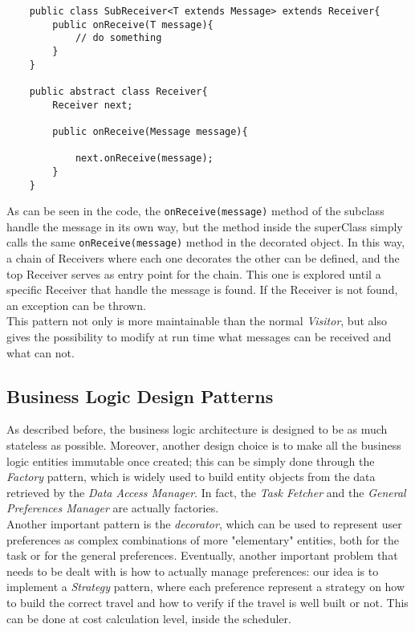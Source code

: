 \begin{verbatim}
    public class SubReceiver<T extends Message> extends Receiver{
        public onReceive(T message){
            // do something
        }
    }
    
    public abstract class Receiver{
        Receiver next;
        
        public onReceive(Message message){
        
            next.onReceive(message);
        }
    }
\end{verbatim}

As can be seen in the code, the \texttt{onReceive(message)} method of the subclass handle the message in its own way, but the method inside the superClass simply calls the same \texttt{onReceive(message)} method in the decorated object. In this way, a chain of Receivers where each one decorates the other can be defined, and the top Receiver serves as entry point for the chain. This one is explored until a specific Receiver that handle the message is found. If the Receiver is not found, an exception can be thrown.\\ 

This pattern not only is more maintainable than the normal \emph{Visitor}, but also gives the possibility to modify at run time what messages can be received and what can not.


\subsection{Business Logic Design Patterns}

As described before, the business logic architecture is designed to be as much stateless as possible. Moreover, another design choice is to make all the business logic entities immutable once created; this can be simply done through the \emph{Factory} pattern, which is widely used to build entity objects from the data retrieved by the \emph{Data Access Manager}. In fact, the \emph{Task Fetcher} and the \emph{General Preferences Manager} are actually factories.  \\
Another important pattern is the \emph{decorator}, which can be used to represent  user preferences as complex combinations of more "elementary" entities, both for the task or for the general preferences. 
Eventually, another important problem that needs to be dealt with is how to actually manage preferences: our idea is to implement a \emph{Strategy} pattern, where each preference represent a strategy on how to build the correct travel and how to verify if the travel is well built or not. This can be done at cost calculation level, inside the scheduler.